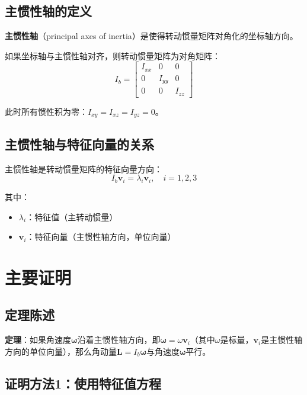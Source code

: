 \documentclass[12pt,a4paper]{article}
\begin{document}
\subsection{主惯性轴的定义}

\textbf{主惯性轴}（principal axes of inertia）是使得转动惯量矩阵对角化的坐标轴方向。

如果坐标轴与主惯性轴对齐，则转动惯量矩阵为对角矩阵：
\begin{equation}
I_b = \begin{bmatrix}
I_{xx} & 0 & 0 \\
0 & I_{yy} & 0 \\
0 & 0 & I_{zz}
\end{bmatrix}
\label{eq:diagonal_inertia}
\end{equation}

此时所有惯性积为零：$I_{xy} = I_{xz} = I_{yz} = 0$。

\subsection{主惯性轴与特征向量的关系}

主惯性轴是转动惯量矩阵的特征向量方向：
\begin{equation}
I_b \bm{v}_i = \lambda_i \bm{v}_i, \quad i = 1, 2, 3
\label{eq:eigenvalue_equation}
\end{equation}

其中：
\begin{itemize}
\item $\lambda_i$：特征值（主转动惯量）
\item $\bm{v}_i$：特征向量（主惯性轴方向，单位向量）
\end{itemize}

\section{主要证明}

\subsection{定理陈述}

\textbf{定理}：如果角速度$\bm{\omega}$沿着主惯性轴方向，即$\bm{\omega} = \omega \bm{v}_i$（其中$\omega$是标量，$\bm{v}_i$是主惯性轴方向的单位向量），那么角动量$\bm{L} = I_b \bm{\omega}$与角速度$\bm{\omega}$平行。

\subsection{证明方法1：使用特征值方程}
\end{document}
